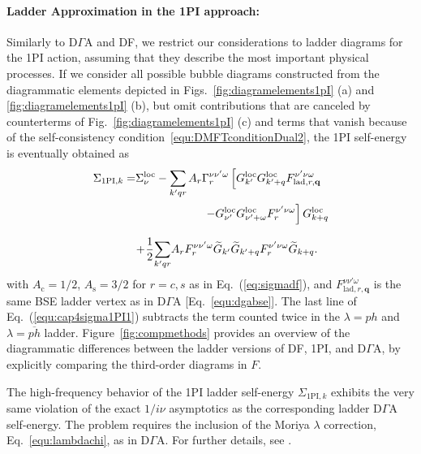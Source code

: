 \documentclass[rmp,aps,reprint,amsmath,amssymb,superscriptaddress,showpacs,nofootinbib]{revtex4-1}
\begin{document}
\paragraph*{Ladder Approximation in the 1PI approach:}
Similarly to D$\Gamma$A and DF, we restrict our considerations to ladder diagrams for the 1PI action, assuming that they describe the most important physical processes. If we consider all possible bubble diagrams constructed from the diagrammatic elements depicted in Figs.~\ref{fig:diagramelements1pI} (a) and \ref{fig:diagramelements1pI} (b), but omit contributions that are canceled by counterterms of Fig.~\ref{fig:diagramelements1pI} (c) and terms that vanish because of the self-consistency condition~\eqref{equ:DMFTconditionDual2}, the 1PI self-energy is eventually obtained as \cite{Rohringer2013,Rohringer2013a}
\begin{align}
  \Sigma_{\text{1PI},k}=& \Sigma^{\text{loc}}_\nu 	-\sum_{k'qr}A_r\Gamma_{r}^{\nu\nu'\omega}\left[G_{k'}^{\text{loc}}G^{\text{loc}}_{k'+q}F_{\text{lad},r,\mathbf{q}}^{\nu'\nu\omega}\right. \notag \\
  &\phantom{\Sigma^{\text{loc}}_\nu -\frac{1}{\beta^2}\sum_{k'qr}}
  \left.-G^\text{loc}_{\nu'}G^\text{loc}_{\nu'+\omega}F_{r}^{\nu'\nu\omega}\right] G^{\text{loc}}_{k+q} \notag \\&\!+\!\frac{1}{2}\!\sum_{k'qr}\!A_rF_{r}^{\nu\nu'\omega}\widetilde{G}_{k'}\widetilde{G}_{k'+q}F_{r}^{\nu'\nu\omega}\widetilde{G}_{k+q}. \label{equ:cap4sigma1PI1}
\end{align}
with $A_\text{c}=1/2$, $A_\text{s}=3/2$ for $r=c,s$ as in Eq.~(\ref{eq:sigmadf}), and $F_{\text{lad},r,\mathbf{q}}^{\nu\nu'\omega}$ is the same BSE ladder vertex as in D$\Gamma$A [Eq.~\eqref{equ:dgabse}]. The last line of Eq.~(\ref{equ:cap4sigma1PI1}) subtracts the term counted twice in the  $\lambda=ph$ and $\lambda=\overline{ph}$ ladder. Figure~\ref{fig:compmethods}  provides an overview of the diagrammatic differences  between  the ladder versions of DF, 1PI, and D$\Gamma$A, by explicitly comparing the third-order diagrams in $F$.

The high-frequency behavior of the 1PI ladder self-energy $\Sigma_{\text{1PI},k}$ exhibits the very same violation of the exact $1/i\nu$ asymptotics as the corresponding ladder D$\Gamma$A self-energy. The problem requires the inclusion of the Moriya $\lambda$ correction, Eq.~\eqref{equ:lambdachi}, as in D$\Gamma$A. For further details, see .
\end{document}
